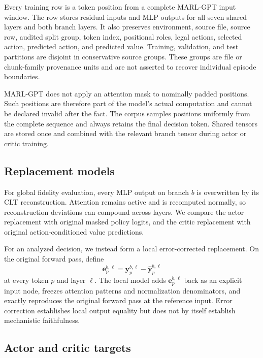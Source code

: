 Every training row is a token position from a complete MARL-GPT input window. The row stores residual inputs and MLP outputs for all seven shared layers and both branch layers. It also preserves environment, source file, source row, audited split group, token index, positional roles, legal actions, selected action, predicted action, and predicted value. Training, validation, and test partitions are disjoint in conservative source groups. These groups are file or chunk-family provenance units and are not asserted to recover individual episode boundaries.

MARL-GPT does not apply an attention mask to nominally padded positions. Such positions are therefore part of the model's actual computation and cannot be declared invalid after the fact. The corpus samples positions uniformly from the complete sequence and always retains the final decision token. Shared tensors are stored once and combined with the relevant branch tensor during actor or critic training.

\subsection{Replacement models}

For global fidelity evaluation, every MLP output on branch $b$ is overwritten by its CLT reconstruction. Attention remains active and is recomputed normally, so reconstruction deviations can compound across layers. We compare the actor replacement with original masked policy logits, and the critic replacement with original action-conditioned value predictions.

For an analyzed decision, we instead form a local error-corrected replacement. On the original forward pass, define
\begin{equation}
    \mathbf{e}^{b,\ell}_p=\mathbf{y}^{b,\ell}_p-\widehat{\mathbf{y}}^{b,\ell}_p
\end{equation}
at every token $p$ and layer $\ell$. The local model adds $\mathbf{e}^{b,\ell}_p$ back as an explicit input node, freezes attention patterns and normalization denominators, and exactly reproduces the original forward pass at the reference input. Error correction establishes local output equality but does not by itself establish mechanistic faithfulness.

\subsection{Actor and critic targets}

